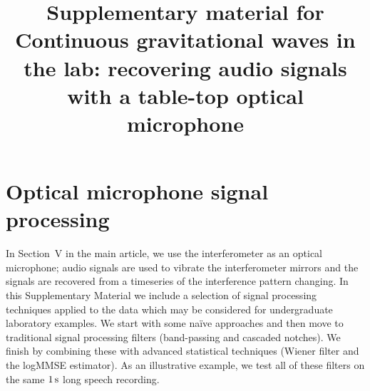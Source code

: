 \documentclass[aps,pra,superscriptaddress,reprint,nofootinbib]{revtex4-1}
\begin{document}
\title{Supplementary material for \\Continuous gravitational waves in the lab: recovering audio signals with a table-top optical microphone} 
\maketitle

\section{Optical microphone signal processing}


In Section~V in the main article, we use the interferometer as an optical microphone; audio signals are used to vibrate the interferometer mirrors and the signals are recovered from a timeseries of the interference pattern changing.
In this Supplementary Material we include a selection of signal processing techniques applied to the data which may be considered for undergraduate laboratory examples. 
We start with some na{\"i}ve approaches and then move to traditional signal processing filters (band-passing and cascaded notches). 
We finish by combining these with advanced statistical techniques (Wiener filter and the logMMSE estimator). 
As an illustrative example, we test all of these filters on the same $1\,{\rm s}$ long speech recording.
\end{document}
